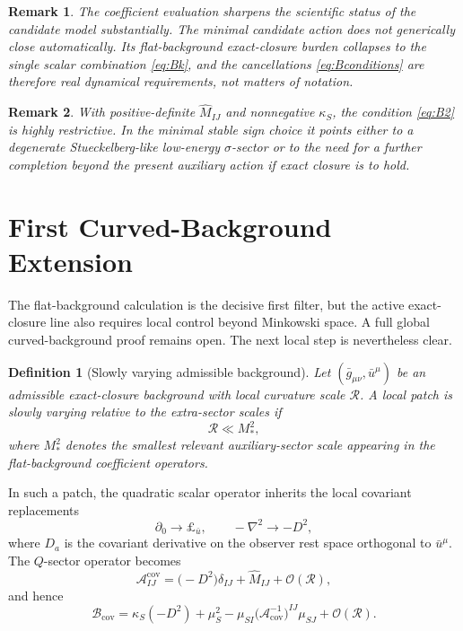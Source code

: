 \documentclass[11pt]{article}
\newtheorem{definition}{Definition}
\newtheorem{remark}{Remark}
\begin{document}
\begin{remark}
The coefficient evaluation sharpens the scientific status of the candidate model substantially. The minimal candidate action does not generically close automatically. Its flat-background exact-closure burden collapses to the single scalar combination \eqref{eq:Bk}, and the cancellations \eqref{eq:Bconditions} are therefore real dynamical requirements, not matters of notation.
\end{remark}

\begin{remark}
With positive-definite \(\widehat M_{IJ}\) and nonnegative \(\kappa_S\), the condition \eqref{eq:B2} is highly restrictive. In the minimal stable sign choice it points either to a degenerate Stueckelberg-like low-energy \(\sigma\)-sector or to the need for a further completion beyond the present auxiliary action if exact closure is to hold.
\end{remark}

\section{First Curved-Background Extension}

The flat-background calculation is the decisive first filter, but the active exact-closure line also requires local control beyond Minkowski space. A full global curved-background proof remains open. The next local step is nevertheless clear.

\begin{definition}[Slowly varying admissible background]
Let \((\bar g_{\mu\nu},\bar u^\mu)\) be an admissible exact-closure background with local curvature scale \(\mathcal R\). A local patch is slowly varying relative to the extra-sector scales if
\begin{equation}
\mathcal R \ll M_*^2,
\label{eq:curvaturehierarchy}
\end{equation}
where \(M_*^2\) denotes the smallest relevant auxiliary-sector scale appearing in the flat-background coefficient operators.
\end{definition}

In such a patch, the quadratic scalar operator inherits the local covariant replacements
\begin{equation}
\partial_0 \to \pounds_{\bar u},
\qquad
-\nabla^2 \to -D^2,
\label{eq:covreplace}
\end{equation}
where \(D_a\) is the covariant derivative on the observer rest space orthogonal to \(\bar u^\mu\). The \(Q\)-sector operator becomes
\begin{equation}
\mathcal A_{IJ}^{\mathrm{cov}}
=
\bigl(-D^2\bigr)\delta_{IJ}
+\widehat M_{IJ}
+\mathcal O(\mathcal R),
\label{eq:Acov}
\end{equation}
and hence
\begin{equation}
\mathcal B_{\mathrm{cov}}
=
\kappa_S(-D^2)
+\mu_S^2
-\mu_{SI}\bigl(\mathcal A_{\mathrm{cov}}^{-1}\bigr)^{IJ}\mu_{SJ}
+\mathcal O(\mathcal R).
\label{eq:Bcov}
\end{equation}
\end{document}
